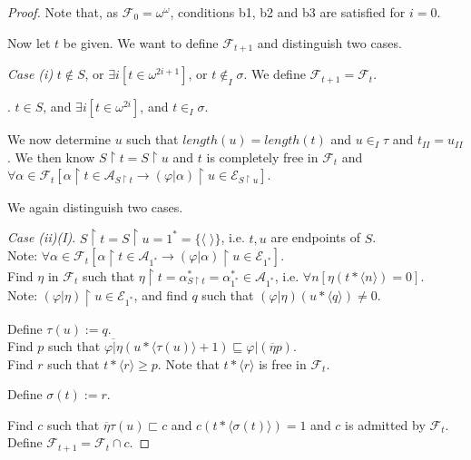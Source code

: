\documentclass[a4paper]{amsart}
\theoremstyle{plain}
\begin{document}
\begin{proof}
 Note that, as $\mathcal{F}_0=\omega^\omega$, conditions b1, b2 and b3 are satisfied for $i=0$. 


Now let $t$ be given. We want to define $\mathcal{F}_{t+1}$ and distinguish two cases.

\smallskip

{\it Case (i)}  $t\notin S$, or $\exists i[t\in \omega^{2i+1}]$, or $t\notin_I\sigma$.  We define $\mathcal{F}_{t+1}=\mathcal{F}_t$.

 
 .  $t\in S$, and $\exists i[t\in \omega^{2i}]$, and $t\in_I\sigma$.
 
  We now determine $u$ such that   $length(u)=length(t)$  and $u\in_I\tau$ and $t_{II}=u_{II}$.  We then know  $S\upharpoonright t=S\upharpoonright u$ and $t$ is  completely free in $\mathcal{F}_t$   and \\$\forall \alpha \in \mathcal{F}_t[\alpha\upharpoonright t \in \mathcal{A}_{S\upharpoonright t} \rightarrow (\varphi|\alpha)\upharpoonright u \in \mathcal{E}_{S\upharpoonright u}]$. 
 
 \smallskip
 
 We again distinguish two cases.
 
 \smallskip
 {\it Case (ii)(I)}. $S\upharpoonright t= S\upharpoonright u =1^\ast=\{\langle\;\rangle\}$, i.e. $t,u$ are endpoints of $S$. \\ Note: $\forall \alpha \in \mathcal{F}_t[\alpha\upharpoonright t \in \mathcal{A}_{1^\ast}\rightarrow (\varphi|\alpha)\upharpoonright u \in \mathcal{E}_{1^\ast}]$. \\Find $\eta$ in $\mathcal{F}_t$ such that $\eta\upharpoonright t =\alpha^\ast_{S\upharpoonright t}=\alpha_{1^\ast}^\ast\in \mathcal{A}_{1^\ast}$, i.e. $\forall n[\eta(t\ast\langle n \rangle)=0]$. \\Note: $(\varphi|\eta)\upharpoonright u \in \mathcal{E}_{1^\ast}$, and find   $q$ such that $(\varphi|\eta)(u\ast\langle q\rangle)\neq 0$.
 
 Define $\tau(u):=q$. \\ Find $p$ such that $\overline{\varphi|\eta}(u\ast\langle \tau(u) \rangle +1)\sqsubseteq \varphi|(\overline \eta p)$.
 \\Find $r$  such that $t\ast\langle r\rangle \ge p$. Note that  $t\ast\langle r\rangle$ is  free in $\mathcal{F}_t$.
 
 Define $\sigma(t):=r$.
  
 Find $c$ such that $\overline \eta \tau(u)\sqsubset c$ and $c(t\ast\langle \sigma(t) \rangle) =1$ and $c$ is admitted by $\mathcal{F}_t$.   
 \\Define   $\mathcal{F}_{t+1}= \mathcal{F}_t \cap c$.
 

\end{proof}
\end{document}
